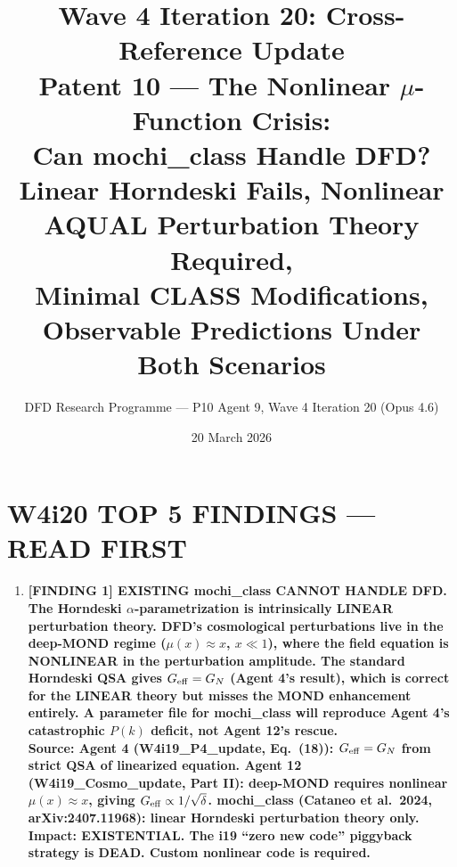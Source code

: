 \documentclass[11pt]{article}
\title{\textbf{Wave 4 Iteration 20: Cross-Reference Update}\\[6pt]
Patent 10 --- The Nonlinear $\mu$-Function Crisis:\\
Can mochi\_class Handle DFD?\\[4pt]
{\normalsize Linear Horndeski Fails, Nonlinear AQUAL Perturbation Theory Required,}\\
{\normalsize Minimal CLASS Modifications, Observable Predictions Under Both Scenarios}}
\author{DFD Research Programme --- P10 Agent 9, Wave 4 Iteration 20 (Opus 4.6)}
\date{20 March 2026}
\theoremstyle{definition}
\theoremstyle{remark}
\newcommand{\Geff}{G_{\rm eff}}
\begin{document}
\maketitle

\section*{W4i20 TOP 5 FINDINGS --- READ FIRST}

\begin{tcolorbox}[colback=blue!5!white, colframe=blue!60!black,
  title=\textbf{W4i20 TOP 5 FINDINGS --- RANKED BY IMPACT}]
\begin{enumerate}[nosep]

\item \textbf{[FINDING 1] EXISTING mochi\_class CANNOT HANDLE DFD.
  The Horndeski $\alpha$-parametrization is intrinsically LINEAR
  perturbation theory. DFD's cosmological perturbations live in the
  deep-MOND regime ($\mu(x) \approx x$, $x \ll 1$), where the field
  equation is NONLINEAR in the perturbation amplitude. The standard
  Horndeski QSA gives $\Geff = G_N$ (Agent 4's result), which is
  correct for the LINEAR theory but misses the MOND enhancement
  entirely. A parameter file for mochi\_class will reproduce
  Agent 4's catastrophic $P(k)$ deficit, not Agent 12's rescue.}\\
  \textbf{Source: Agent 4 (W4i19\_P4\_update, Eq.~(18)):
  $\Geff = G_N$ from strict QSA of linearized equation.
  Agent 12 (W4i19\_Cosmo\_update, Part II): deep-MOND requires
  nonlinear $\mu(x) \approx x$, giving $\Geff \propto 1/\sqrt{\delta}$.
  mochi\_class (Cataneo et al.\ 2024, arXiv:2407.11968): linear
  Horndeski perturbation theory only.}\\
  \textbf{Impact: EXISTENTIAL. The i19 ``zero new code'' piggyback
  strategy is DEAD. Custom nonlinear code is required.}


\end{enumerate}
\end{tcolorbox}
\end{document}
